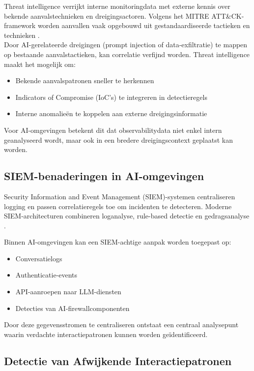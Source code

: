 Threat intelligence verrijkt interne monitoringdata met externe kennis over bekende aanvalstechnieken en dreigingsactoren. Volgens het MITRE ATT\&CK-framework worden aanvallen vaak opgebouwd uit gestandaardiseerde tactieken en technieken \autocite{strom2018mitre}.\\

Door AI-gerelateerde dreigingen (prompt injection of data-exfiltratie) te mappen op bestaande aanvalstactieken, kan correlatie verfijnd worden. Threat intelligence maakt het mogelijk om:

\begin{itemize}
    \item Bekende aanvalspatronen sneller te herkennen
    \item Indicators of Compromise (IoC’s) te integreren in detectieregels
    \item Interne anomalieën te koppelen aan externe dreigingsinformatie
\end{itemize}

Voor AI-omgevingen betekent dit dat observabilitydata niet enkel intern geanalyseerd wordt, maar ook in een bredere dreigingscontext geplaatst kan worden.

\subsection{SIEM-benaderingen in AI-omgevingen}

Security Information and Event Management (SIEM)-systemen centraliseren logging en passen correlatieregels toe om incidenten te detecteren. Moderne SIEM-architecturen combineren loganalyse, rule-based detectie en gedragsanalyse \autocite{chandola2009anomaly}.

Binnen AI-omgevingen kan een SIEM-achtige aanpak worden toegepast op:

\begin{itemize}
    \item Conversatielogs
    \item Authenticatie-events
    \item API-aanroepen naar LLM-diensten
    \item Detecties van AI-firewallcomponenten
\end{itemize}

Door deze gegevensstromen te centraliseren ontstaat een centraal analysepunt waarin verdachte interactiepatronen kunnen worden geïdentificeerd.

\subsection{Detectie van Afwijkende Interactiepatronen}


